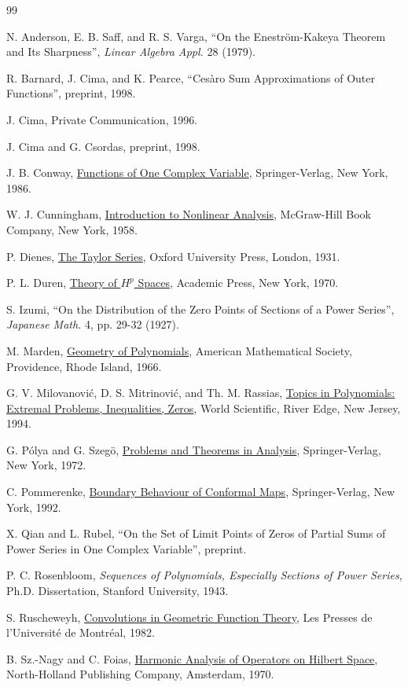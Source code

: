 \documentclass[final]{siamltex}
\begin{document}
\begin{thebibliography}{99}

 N. Anderson, E. B. Saff, and R. S. Varga, ``On the Enestr\"{o}m-Kakeya Theorem and Its Sharpness'', {\em Linear Algebra Appl.} 28 (1979).

 R. Barnard, J. Cima, and K. Pearce, ``Ces\`{a}ro Sum Approximations of Outer Functions'', preprint, 1998.

 J. Cima, Private Communication, 1996.

 J. Cima and G. Csordas, preprint, 1998.

 J. B. Conway, \underline{Functions of One Complex Variable}, Springer-Verlag, New York, 1986.

 W. J. Cunningham, \underline{Introduction to Nonlinear Analysis}, McGraw-Hill Book Company, New York, 1958.

 P. Dienes, \underline{The Taylor Series}, Oxford University Press, London, 1931.

 P. L. Duren, \underline{Theory of ${H}^{p}$ Spaces}, Academic Press, New York, 1970.

 S. Izumi, ``On the Distribution of the Zero Points of Sections of a Power Series'', {\em Japanese Math.} 4, pp. 29-32 (1927).

 M. Marden, \underline{Geometry of Polynomials}, American Mathematical Society, Providence, Rhode Island, 1966.
  
 G. V. Milovanovi\'{c}, D. S. Mitrinovi\'{c}, and Th. M. Rassias,  \underline{Topics in Polynomials: Extremal Problems, Inequalities, Zeros}, World Scientific, River Edge, New Jersey, 1994.

 G. P\'{o}lya and G. Szeg\"{o}, \underline{Problems and Theorems in Analysis}, Springer-Verlag, New York, 1972.


 C. Pommerenke, \underline{Boundary Behaviour of Conformal Maps}, Springer-Verlag, New York, 1992.


  X. Qian and L. Rubel, ``On the Set of Limit Points of Zeros of Partial Sums of Power Series in One Complex Variable'', preprint.

 P. C. Rosenbloom, {\em Sequences of Polynomials, Especially Sections of Power Series}, Ph.D. Dissertation, Stanford University, 1943.

 S. Ruscheweyh, \underline{Convolutions in Geometric Function Theory}, Les Presses de l'Universit\'{e} de Montr\'{e}al, 1982.

 B. Sz.-Nagy and C. Foias, \underline{Harmonic Analysis of Operators on Hilbert Space}, North-Holland Publishing Company, Amsterdam, 1970.

\end{thebibliography}



 
\end{document}
